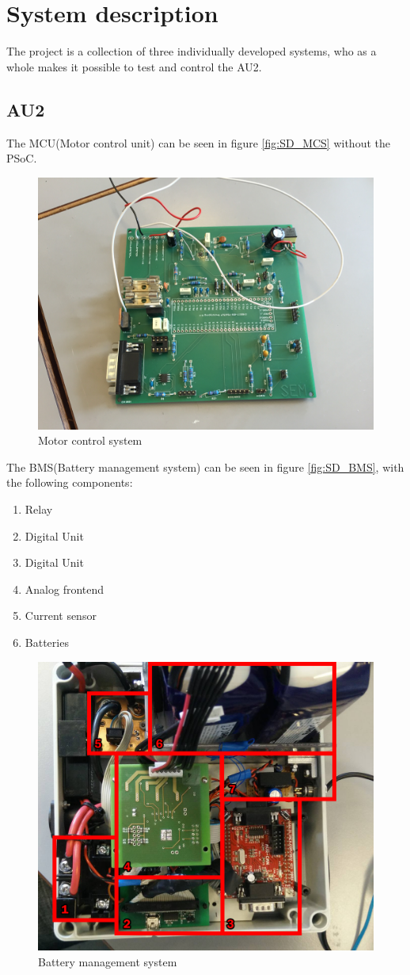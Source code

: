 \chapter{System description}
The project is a collection of three individually developed systems, who as a whole makes it possible to test and control the AU2.

\section{AU2}
The MCU(Motor control unit) can be seen in figure \vref{fig:SD_MCS} without the PSoC.

\begin{figure}[H]
	\centering
	\includegraphics[width=0.6\linewidth]{SubPages/Images/SD_MCS}
	\caption{Motor control system}
	\label{fig:SD_MCS}
\end{figure}

The BMS(Battery management system) can be seen in figure \vref{fig:SD_BMS}, with the following components:

\begin{enumerate}
	\item Relay
	\item Digital Unit
	\item Digital Unit
	\item Analog frontend
	\item Current sensor
	\item Batteries
\end{enumerate}

\begin{figure}[H]
	\centering
	\includegraphics[width=0.7\linewidth]{SubPages/Images/SD_BMS}
	\caption{Battery management system}
	\label{fig:SD_BMS}
\end{figure}

